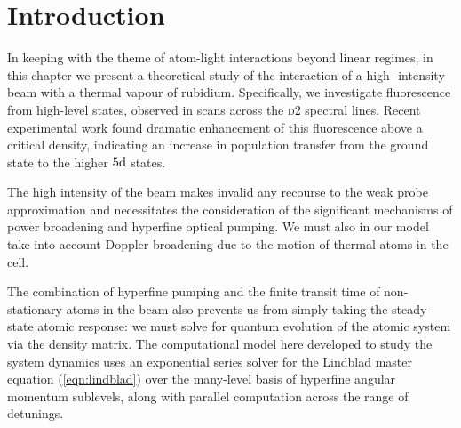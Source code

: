 \section{Introduction}
  \label{sec:twophoton_intro}

    In keeping with the theme of atom-light interactions beyond linear regimes,
    in this chapter we present a theoretical study of the interaction of a high-
    intensity beam with a thermal vapour of rubidium. Specifically, we
    investigate fluorescence from high-level states, observed in scans across
    the \textsc{d2} spectral lines. Recent experimental work\cite{Weller2013}
    found dramatic enhancement of this fluorescence above a critical density,
    indicating an increase in population transfer from the ground state to the
    higher $5\rm{d}$ states.

    The high intensity of the beam makes invalid any recourse to the weak probe
    approximation and necessitates the consideration of the significant
    mechanisms of power broadening and hyperfine optical pumping. We must also
    in our model take into account Doppler broadening due to the motion of
    thermal atoms in the cell.

    The combination of hyperfine pumping and the finite transit time of 
    non-stationary atoms in the beam also prevents us from simply taking the 
    steady-state atomic response: we must solve for quantum evolution of the 
    atomic system via the density matrix. The computational model here developed
    to study the system dynamics uses an exponential series solver for the
    Lindblad master equation (\ref{eqn:lindblad}) over the many-level basis of
    hyperfine angular momentum sublevels, along with parallel computation across
    the range of detunings.
